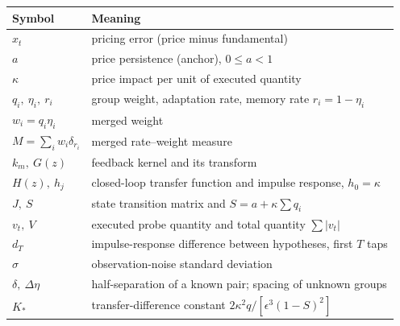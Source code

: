 \documentclass[12pt]{article}
\theoremstyle{definition}
\theoremstyle{remark}
\begin{document}
\begin{longtable}{p{}p{}}
\toprule
Symbol & Meaning\\
\midrule
\endhead
$x_t$ & pricing error (price minus fundamental)\\
$a$ & price persistence (anchor), $0\le a<1$\\
$\kappa$ & price impact per unit of executed quantity\\
$q_i,\ \eta_i,\ r_i$ & group weight, adaptation rate, memory rate $r_i=1-\eta_i$\\
$w_i=q_i\eta_i$ & merged weight\\
$M=\sum_iw_i\delta_{r_i}$ & merged rate--weight measure\\
$k_m,\ G(z)$ & feedback kernel and its transform\\
$H(z),\ h_j$ & closed-loop transfer function and impulse response, $h_0=\kappa$\\
$J,\ S$ & state transition matrix and $S=a+\kappa\sum q_i$\\
$v_t,\ V$ & executed probe quantity and total quantity $\sum|v_t|$\\
$d_T$ & impulse-response difference between hypotheses, first $T$ taps\\
$\sigma$ & observation-noise standard deviation\\
$\delta,\ \Delta\eta$ & half-separation of a known pair; spacing of unknown groups\\
$K_*$ & transfer-difference constant $2\kappa^2q/[\epsilon^3(1-S)^2]$\\
\bottomrule
\end{longtable}
\end{document}
